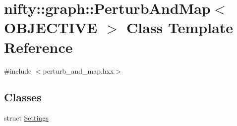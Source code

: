 \hypertarget{classnifty_1_1graph_1_1PerturbAndMap}{}\section{nifty\+:\+:graph\+:\+:Perturb\+And\+Map$<$ O\+B\+J\+E\+C\+T\+I\+V\+E $>$ Class Template Reference}
\label{classnifty_1_1graph_1_1PerturbAndMap}


{\ttfamily \#include $<$perturb\+\_\+and\+\_\+map.\+hxx$>$}

\subsection*{Classes}
\begin{DoxyCompactItemize}
\item 
struct \hyperlink{structnifty_1_1graph_1_1PerturbAndMap_1_1Settings}{Settings}
\end{DoxyCompactItemize}
